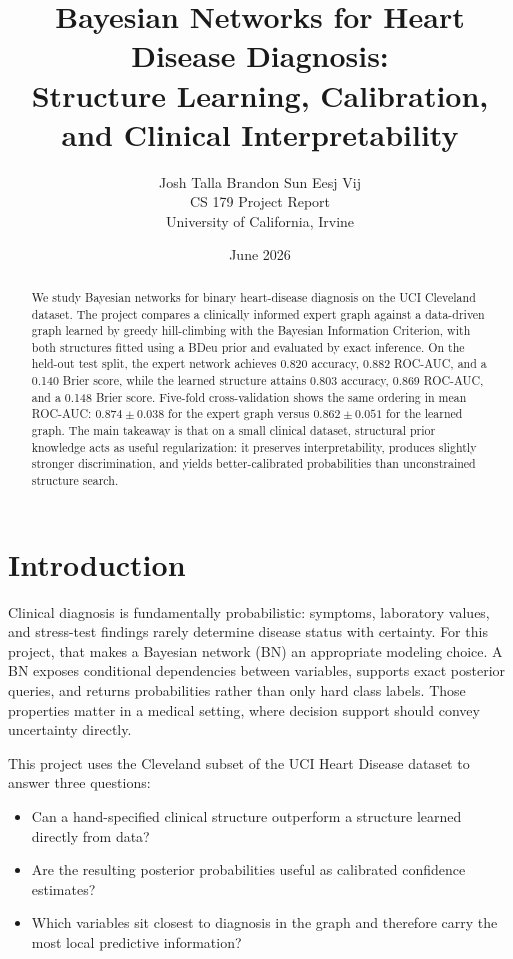 \documentclass[10pt,twocolumn]{article}
\title{\textbf{Bayesian Networks for Heart Disease Diagnosis:}\\
\textbf{Structure Learning, Calibration, and Clinical Interpretability}}
\author{Josh Talla \quad Brandon Sun \quad Eesj Vij\\CS 179 Project Report\\University of California, Irvine}
\date{June 2026}
\begin{document}
\maketitle

\begin{abstract}
We study Bayesian networks for binary heart-disease diagnosis on the UCI Cleveland dataset. The project compares a clinically informed expert graph against a data-driven graph learned by greedy hill-climbing with the Bayesian Information Criterion, with both structures fitted using a BDeu prior and evaluated by exact inference. On the held-out test split, the expert network achieves 0.820 accuracy, 0.882 ROC-AUC, and a 0.140 Brier score, while the learned structure attains 0.803 accuracy, 0.869 ROC-AUC, and a 0.148 Brier score. Five-fold cross-validation shows the same ordering in mean ROC-AUC: $0.874 \pm 0.038$ for the expert graph versus $0.862 \pm 0.051$ for the learned graph. The main takeaway is that on a small clinical dataset, structural prior knowledge acts as useful regularization: it preserves interpretability, produces slightly stronger discrimination, and yields better-calibrated probabilities than unconstrained structure search.
\end{abstract}

\section{Introduction}
Clinical diagnosis is fundamentally probabilistic: symptoms, laboratory values, and stress-test findings rarely determine disease status with certainty. For this project, that makes a Bayesian network (BN) an appropriate modeling choice. A BN exposes conditional dependencies between variables, supports exact posterior queries, and returns probabilities rather than only hard class labels. Those properties matter in a medical setting, where decision support should convey uncertainty directly.

This project uses the Cleveland subset of the UCI Heart Disease dataset to answer three questions:
\begin{itemize}
  \item Can a hand-specified clinical structure outperform a structure learned directly from data?
  \item Are the resulting posterior probabilities useful as calibrated confidence estimates?
  \item Which variables sit closest to diagnosis in the graph and therefore carry the most local predictive information?
\end{itemize}
\end{document}

